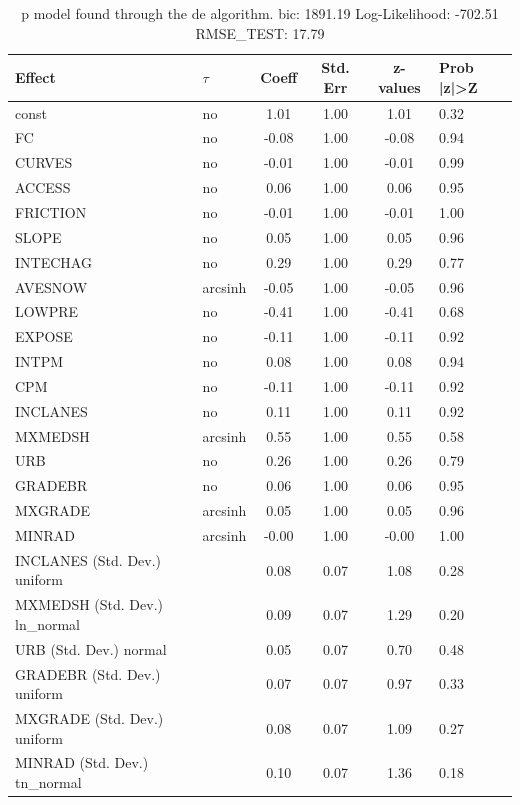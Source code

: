 \begin{table}
	\caption{p model found through the de algorithm. bic: 1891.19 Log-Likelihood: -702.51 RMSE_TEST: 17.79}
	\begin{center}
		\begin{tabular}{|l|l|c|c|c|l|}
			\hline
			Effect & $\tau$ & Coeff & Std. Err & z-values & Prob |z|>Z \\
			\hline
			const & no & 1.01 & 1.00 & 1.01 & 0.32 \\
			\hline
			FC & no & -0.08 & 1.00 & -0.08 & 0.94 \\
			\hline
			CURVES & no & -0.01 & 1.00 & -0.01 & 0.99 \\
			\hline
			ACCESS & no & 0.06 & 1.00 & 0.06 & 0.95 \\
			\hline
			FRICTION & no & -0.01 & 1.00 & -0.01 & 1.00 \\
			\hline
			SLOPE & no & 0.05 & 1.00 & 0.05 & 0.96 \\
			\hline
			INTECHAG & no & 0.29 & 1.00 & 0.29 & 0.77 \\
			\hline
			AVESNOW & arcsinh & -0.05 & 1.00 & -0.05 & 0.96 \\
			\hline
			LOWPRE & no & -0.41 & 1.00 & -0.41 & 0.68 \\
			\hline
			EXPOSE & no & -0.11 & 1.00 & -0.11 & 0.92 \\
			\hline
			INTPM & no & 0.08 & 1.00 & 0.08 & 0.94 \\
			\hline
			CPM & no & -0.11 & 1.00 & -0.11 & 0.92 \\
			\hline
			INCLANES & no & 0.11 & 1.00 & 0.11 & 0.92 \\
			\hline
			MXMEDSH & arcsinh & 0.55 & 1.00 & 0.55 & 0.58 \\
			\hline
			URB & no & 0.26 & 1.00 & 0.26 & 0.79 \\
			\hline
			GRADEBR & no & 0.06 & 1.00 & 0.06 & 0.95 \\
			\hline
			MXGRADE & arcsinh & 0.05 & 1.00 & 0.05 & 0.96 \\
			\hline
			MINRAD & arcsinh & -0.00 & 1.00 & -0.00 & 1.00 \\
			\hline
			INCLANES (Std. Dev.) uniform &  & 0.08 & 0.07 & 1.08 & 0.28 \\
			\hline
			MXMEDSH (Std. Dev.) ln_normal &  & 0.09 & 0.07 & 1.29 & 0.20 \\
			\hline
			URB (Std. Dev.) normal &  & 0.05 & 0.07 & 0.70 & 0.48 \\
			\hline
			GRADEBR (Std. Dev.) uniform &  & 0.07 & 0.07 & 0.97 & 0.33 \\
			\hline
			MXGRADE (Std. Dev.) uniform &  & 0.08 & 0.07 & 1.09 & 0.27 \\
			\hline
			MINRAD (Std. Dev.) tn_normal &  & 0.10 & 0.07 & 1.36 & 0.18 \\
			\hline
		\end{tabular}
	\end{center}
\end{table}